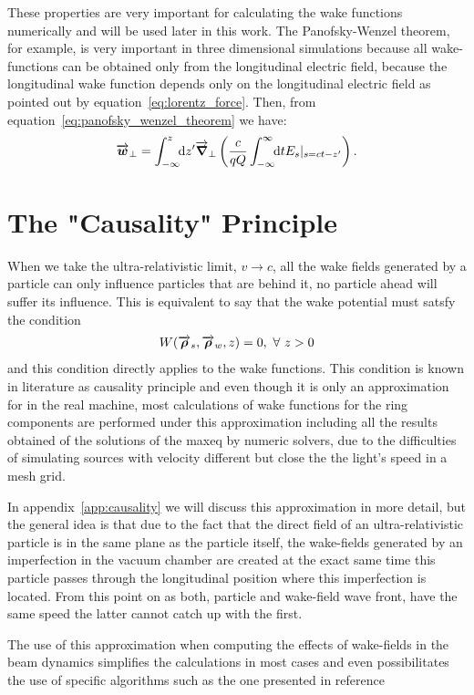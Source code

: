 \documentclass[
	12pt,				%
	openright,			%
	oneside,			%
	a4paper,		%
	chapter=TITLE,		%
	section=TITLE,		%
    brazil,				%
	english,			%
	sumario=tradicional,
	]{abntex2}
\begin{document}
  These properties are very important for calculating the wake functions numerically and will be used later in this work. The Panofsky-Wenzel theorem, for example, is very important in three dimensional simulations because all wake-functions can be obtained only from the longitudinal electric field, because the longitudinal wake function depends only on the longitudinal electric field as pointed out by equation~\eqref{eq:lorentz_force}. Then, from equation~\eqref{eq:panofsky_wenzel_theorem} we have:
  \begin{align}
  	  \vect{w}_\perp = \defint{z'}{\vect{\nabla}_\perp\left(\frac{c}{qQ}\infint{t}{E_s|_{s=ct-z'}}\right)}{-\infty}{z}.
  \end{align}

  \section{The "Causality" Principle}

  When we take the ultra-relativistic limit, $v \to c$, all the wake fields generated by a particle can only influence particles that are behind it, no particle ahead will suffer its influence. This is equivalent to say that the wake potential must satsfy the condition
  \begin{align}
  	  W(\vect{\rho}_s, \vect{\rho}_w, z) = 0, \,\,  \forall\,\, z > 0
  \end{align}
  and this condition directly applies to the wake functions. This condition is known in literature as causality principle and even though it is only an approximation for in the real machine, most calculations of wake functions for the ring components are performed under this approximation including all the results obtained of the solutions of the \gls{maxeq} by numeric solvers, due to the difficulties of simulating sources with velocity different but close the the light's speed in a mesh grid.

  In appendix~\ref{app:causality} we will discuss this approximation in more detail, but the general idea is that due to the fact that the direct field of an ultra-relativistic particle is in the same plane as the particle itself, the wake-fields generated by an imperfection in the vacuum chamber are created at the exact same time this particle passes through the longitudinal position where this imperfection is located. From this point on as both, particle and wake-field wave front, have the same speed the latter cannot catch up with the first.

  The use of this approximation when computing the effects of wake-fields in the beam dynamics simplifies the calculations in most cases and even possibilitates the use of specific algorithms such as the one presented in reference \cite{bane}
\end{document}
